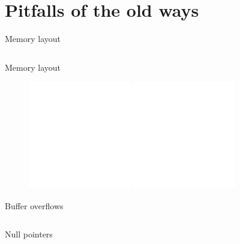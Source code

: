 \documentclass[usenames,dvipsnames,10pt,aspectratio=169]{beamer}
\begin{document}

\section{Pitfalls of the old ways}

\begin{frame}{Memory layout} 
\inputminted[fontsize=\large]{c}{code/stack.c}
\end{frame}

\begin{frame}{Memory layout} 

\begin{figure}[ht]
	\includegraphics[width=0.4\textwidth]{graphics/stack1.png}
  \hfill
	\includegraphics[width=0.4\textwidth]{graphics/stack2.png}
	\hfill
\end{figure}
	
\end{frame}

\begin{frame}{Buffer overflows} 
	\inputminted[fontsize=\large]{c}{code/overflow.c}
\end{frame}

\begin{frame}{Null pointers}
	\inputminted[fontsize=\large]{c}{code/nullp.c}
\end{frame}
\end{document}
